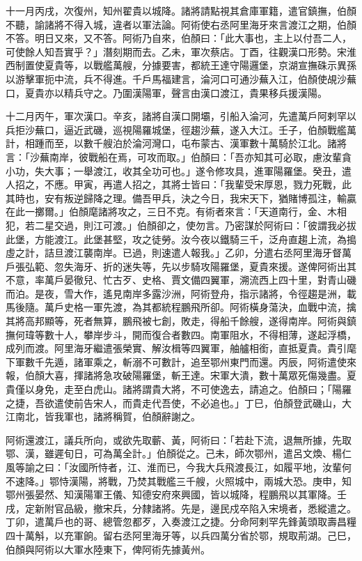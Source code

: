 \begin{pinyinscope}
 十一月丙戌，次復州，知州翟貴以城降。諸將請點視其倉庫軍籍，遣官鎮撫，伯顏不聽，諭諸將不得入城，違者以軍法論。阿術使右丞阿里海牙來言渡江之期，伯顏不答。明日又來，又不答。阿術乃自來，伯顏曰：「此大事也，主上以付吾二人，可使餘人知吾實乎？」潛刻期而去。乙未，軍次蔡店。丁酉，往觀漢口形勢。宋淮西制置使夏貴等，以戰艦萬艘，分據要害，都統王達守陽邏堡，京湖宣撫硃示異孫以游擊軍扼中流，兵不得進。千戶馬福建言，淪河口可通沙蕪入江，伯顏使覘沙蕪口，夏貴亦以精兵守之。乃圍漢陽軍，聲言由漢口渡江，貴果移兵援漢陽。



 十二月丙午，軍次漢口。辛亥，諸將自漢口開壩，引船入淪河，先遣萬戶阿剌罕以兵拒沙蕪口，逼近武磯，巡視陽羅城堡，徑趨沙蕪，遂入大江。壬子，伯顏戰艦萬計，相踵而至，以數千艘泊於淪河灣口，屯布蒙古、漢軍數十萬騎於江北。諸將言：「沙蕪南岸，彼戰船在焉，可攻而取。」伯顏曰：「吾亦知其可必取，慮汝輩貪小功，失大事；一舉渡江，收其全功可也。」遂令修攻具，進軍陽羅堡。癸丑，遣人招之，不應。甲寅，再遣人招之，其將士皆曰：「我輩受宋厚恩，戮力死戰，此其時也，安有叛逆歸降之理。備吾甲兵，決之今日，我宋天下，猶賭博孤注，輸贏在此一擲爾。」伯顏麾諸將攻之，三日不克。有術者來言：「天道南行，金、木相犯，若二星交過，則江可渡。」伯顏卻之，使勿言。乃密謀於阿術曰：「彼謂我必拔此堡，方能渡江。此堡甚堅，攻之徒勞。汝今夜以鐵騎三千，泛舟直趨上流，為搗虛之計，詰旦渡江襲南岸。已過，則速遣人報我。」乙卯，分遣右丞阿里海牙督萬戶張弘範、忽失海牙、折的迷失等，先以步騎攻陽羅堡，夏貴來援。遂俾阿術出其不意，率萬戶晏徹兒、忙古歹、史格、賈文備四翼軍，溯流西上四十里，對青山磯而泊。是夜，雪大作，遙見南岸多露沙洲，阿術登舟，指示諸將，令徑趨是洲，載馬後隨。萬戶史格一軍先渡，為其都統程鵬飛所卻。阿術橫身蕩決，血戰中流，擒其將高邦顯等，死者無算，鵬飛被七創，敗走，得船千餘艘，遂得南岸。阿術與鎮撫何瑋等數十人，攀岸步斗，開而復合者數四。南軍阻水，不得相薄，遂起浮橋，成列而渡。阿里海牙繼遣張榮實、解汝楫等四翼軍，舳艫相銜，直抵夏貴。貴引麾下軍數千先遁，諸軍乘之，斬溺不可數計，追至鄂州東門而還。丙辰，阿術遣使來報，伯顏大喜，揮諸將急攻破陽羅堡，斬王達。宋軍大潰，數十萬眾死傷幾盡。夏貴僅以身免，走至白虎山。諸將謂貴大將，不可使逸去，請追之。伯顏曰；「陽羅之捷，吾欲遣使前告宋人，而貴走代吾使，不必追也。」丁巳，伯顏登武磯山，大江南北，皆我軍也，諸將稱賀，伯顏辭謝之。



 阿術還渡江，議兵所向，或欲先取蘄、黃，阿術曰：「若赴下流，退無所據，先取鄂、漢，雖遲旬日，可為萬全計。」伯顏從之。己未，師次鄂州，遣呂文煥、楊仁風等諭之曰：「汝國所恃者，江、淮而已，今我大兵飛渡長江，如履平地，汝輩何不速降。」鄂恃漢陽，將戰，乃焚其戰艦三千艘，火照城中，兩城大恐。庚申，知鄂州張晏然、知漢陽軍王儀、知德安府來興國，皆以城降，程鵬飛以其軍降。壬戌，定新附官品級，撤宋兵，分隸諸將。先是，邊民戍卒陷入宋境者，悉縱遣之。丁卯，遣萬戶也的哥、總管忽都歹，入奏渡江之捷。分命阿剌罕先鋒黃頭取壽昌糧四十萬斛，以充軍餉。留右丞阿里海牙等，以兵四萬分省於鄂，規取荊湖。己巳，伯顏與阿術以大軍水陸東下，俾阿術先據黃州。




\end{pinyinscope}
